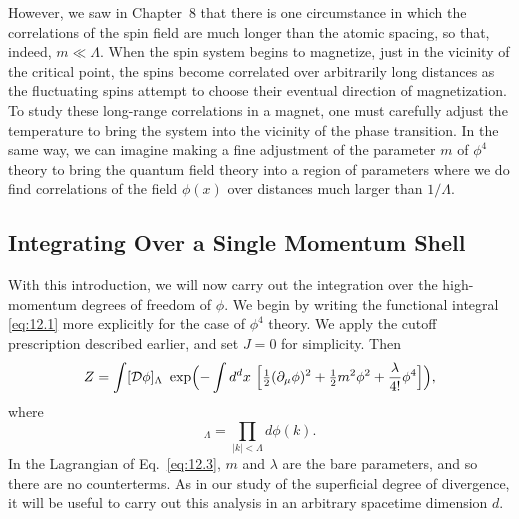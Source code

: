 However, we saw in Chapter~8 that there is one circumstance in which the
correlations of the spin field are much longer than the atomic spacing, so
that, indeed, $m \ll \Lambda$.  When the spin system begins to magnetize, just
in the vicinity of the critical point, the spins become correlated over
arbitrarily long distances as the fluctuating spins attempt to choose their
eventual direction of magnetization.  To study these long-range correlations
in a magnet, one must carefully adjust the temperature to bring the system
into the vicinity of the phase transition.  In the same way, we can imagine
making a fine adjustment of the parameter $m$ of $\phi^4$ theory to bring the
quantum field theory into a region of parameters where we do find
correlations of the field $\phi(x)$ over distances much larger than
$1/\Lambda$.

\subsection{Integrating Over a Single Momentum Shell}

With this introduction, we will now carry out the integration over the
high-momentum degrees of freedom of $\phi$.  We begin by writing the
functional integral \eqref{eq:12.1} more explicitly for the case of $\phi^4$
theory.  We apply the cutoff prescription described earlier, and set $J = 0$
for simplicity.  Then
\begin{equation}
  Z = \int [\mathcal{D}\phi]_\Lambda\ \exp\Bigl( -\int d^dx\ \Bigl[
    \tfrac{1}{2}(\partial_\mu\phi)^2 + \tfrac{1}{2}m^2\phi^2
    + \frac{\lambda}{4!}\phi^4 \Bigr] \Bigr),
  \label{eq:12.3}
\end{equation}
where
\begin{equation}
  [\mathcal{D}\phi]_\Lambda = \prod_{|k|<\Lambda} d\phi(k) .
  \label{eq:12.4}
\end{equation}
In the Lagrangian of Eq.~\eqref{eq:12.3}, $m$ and $\lambda$ are the bare
parameters, and so there are no counterterms.  As in our study of the
superficial degree of divergence, it will be useful to carry out this analysis
in an arbitrary spacetime dimension $d$.


